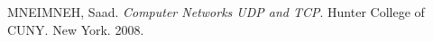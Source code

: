 \begin{thebibliography}{99}
    MNEIMNEH, Saad. \emph{Computer Networks UDP and TCP}. Hunter College of CUNY. New York. 2008.
%
%
%
%
%
%
%
%
%
%
\end{thebibliography}


%
%
%
